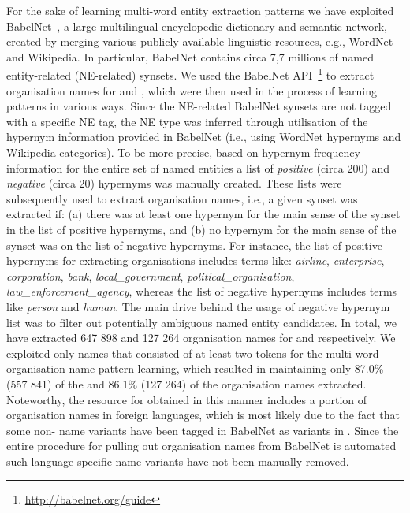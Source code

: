 \documentclass[output=paper]{langsci/langscibook}
\begin{document}
For the sake of learning multi-word entity extraction patterns we have exploited BabelNet~\citep{navigli-12},
a large multilingual encyclopedic dictionary and semantic network, created by merging various publicly available linguistic resources, e.g., WordNet and Wikipedia. In particular, BabelNet contains circa 7,7 millions of named entity-related (NE-related) synsets. We used the BabelNet API~\footnote{\url{http://babelnet.org/guide}} to extract organisation names for  and , which were then used in the process of learning patterns in various ways. Since the NE-related BabelNet synsets are not tagged with a specific NE tag, the NE type was inferred through utilisation of the hypernym information provided in BabelNet (i.e., using WordNet hypernyms and Wikipedia categories). To be more precise, based on hypernym frequency information for the entire set of named entities a list of \textit{positive} (circa 200) and \textit{negative} (circa 20) hypernyms was manually created. These lists were subsequently used to extract organisation names, i.e., a given synset was extracted if: (a) there was at least one hypernym for the main sense of the synset in the list of positive hypernyms, and (b) no hypernym for the main sense of the synset was on the list of negative hypernyms. For instance, the list of positive hypernyms for extracting organisations includes terms like: \textit{airline}, \textit{enterprise}, \textit{corporation}, \textit{bank}, \textit{local\_government}, \textit{political\_organisation}, \textit{law\_enforcement\_agency}, whereas the list of negative hypernyms includes terms like \textit{person} and \textit{human}. The main drive behind the usage of negative hypernym list was to filter out potentially ambiguous named entity candidates. In total, we have extracted 647 898 and 127 264 organisation names for  and  respectively. We exploited only names that consisted of at least two tokens for the multi-word organisation name pattern learning, which resulted in maintaining only 87.0\% (557 841) of the  and 86.1\% (127 264) of the  organisation names extracted. Noteworthy, the resource for  obtained in this manner includes a portion of organisation names in foreign languages, which is most likely due to the fact that some non- name variants have been tagged in BabelNet as variants in . Since the entire procedure for pulling out organisation names from BabelNet is automated such language-specific name variants have not been manually removed.
\end{document}
